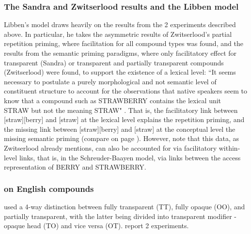 \subsubsection{The Sandra and Zwitserlood results and the Libben model}
\label{sec:cons_for_modelling}

Libben's \citeyearpar{Libben:1998} model draws heavily on the
results from the 2 experiments described above.
In particular, he takes the asymmetric results of Zwitserlood's partial
repetition priming, where facilitation for all compound types was
found, and the results from the semantic priming paradigms, where only
facilitatory effect for transparent (Sandra) or transparent and
partially transparent compounds (Zwitserlood) were found, to support
the existence of a lexical level: ``It
seems necessary to postulate a purely morphological and not semantic level
of constituent structure to account for the observations that native speakers
seem to know that a compound such as STRAWBERRY contains the lexical
unit STRAW but not the meaning STRAW" \citep[36]{Libben:1998}. %
That
is, the facilitatory link between [straw][berry] and [straw] at the
lexical level explains the repetition priming, and the missing link
between [straw][berry] and [straw] at the conceptual level the missing
semantic priming (compare  on page \pageref{fig:libben-1998}). However, note that this data, as
Zwitserlood already mentions, can also be accounted for via
facilitatory within-level links, that is, in the Schreuder-Baayen
model, via links between the access representation of BERRY and STRAWBERRY. 


\subsubsection{\citet{Libbenetal:2003} on English compounds}
\label{sec:libbenetal2003}
\citet{Libbenetal:2003} used a
4-way distinction between fully transparent (TT), fully opaque
(OO), and partially transparent, with the latter being divided into
transparent modifier -  opaque head (TO) and vice versa (OT). \citet{Libbenetal:2003} report 2 experiments.

